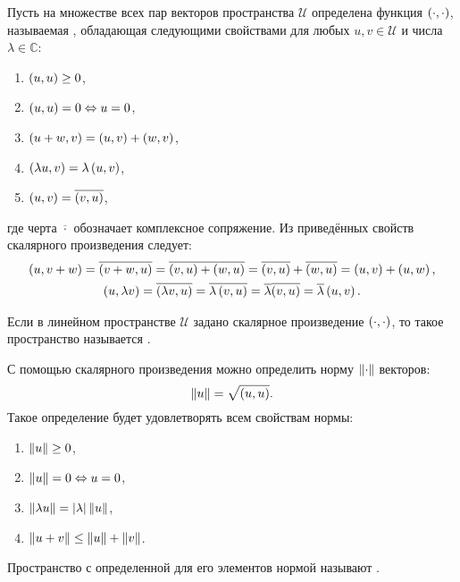 Пусть на множестве всех пар векторов пространства $\mathcal{U}$ определена функция $\left ( \cdot, \cdot \right )$, называемая , обладающая
следующими свойствами для любых $u, v \in \mathcal{U}$ и числа $\lambda \in \mathbb{C}$:
\begin{enumerate}
    \item $\left ( u, u \right ) \ge 0$,
    \item $\left ( u, u \right ) = 0 \Leftrightarrow u = 0$,
    \item $\left ( u + w, v \right ) = \left ( u, v \right ) + \left ( w, v \right )$,
    \item $\left ( \lambda u, v \right ) = \lambda \left ( u, v \right )$,
    \item $\left ( u, v \right ) = \overline{\left ( v, u \right )}$,
\end{enumerate}
где черта $\overline{\cdot}$ обозначает комплексное сопряжение. Из приведённых свойств скалярного произведения следует:
\begin{gather*}
    \left ( u, v + w \right )
    = \overline{\left ( v + w, u \right )}
    = \overline{\left ( v, u \right ) + \left ( w, u \right )}
    = \overline{\left ( v, u \right )} + \overline{\left ( w, u \right )}
    = \left ( u, v \right ) + \left ( u, w \right ), \\
    \left ( u, \lambda v \right )
    = \overline{\left ( \lambda v, u \right )}
    = \overline{\lambda  \left ( v, u \right )}
    = \overline{\lambda} \overline{\left ( v, u \right )}
    = \overline{\lambda} \left ( u, v \right ) .
\end{gather*}

Если в линейном пространстве $\mathcal{U}$ задано скалярное произведение $\left ( \cdot, \cdot \right )$, то такое пространство называется .

С помощью скалярного произведения можно определить норму $\left \| \cdot \right \|$ векторов:
\[
    \left \| u \right \| = \sqrt{\left ( u, u \right )}.
\]
Такое определение будет удовлетворять всем свойствам нормы:
\begin{enumerate}
    \item $\left \| u \right \| \ge 0$,
    \item $\left \| u \right \| = 0 \Leftrightarrow u = 0$,
    \item $\left \| \lambda u \right \| = \left | \lambda \right | \left \| u \right \|$,
    \item $\left \| u + v \right \| \le \left \| u \right \| + \left \| v \right \|$.
\end{enumerate}
Пространство с определенной для его элементов нормой называют .


